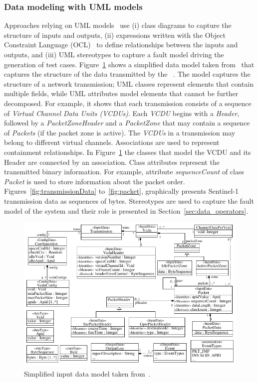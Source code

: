 

\subsubsection{Data modeling with UML models}

Approaches relying on UML models~\cite{di2015generating,di2015evolutionary} use (i) class diagrams to capture the structure of inputs and outputs, (ii) expressions written with the Object Constraint Language (OCL)~\cite{OCL} to define relationships between the inputs and outputs, and (iii) UML stereotypes to capture a fault model driving the generation of test cases.
Figure~\ref{fig:dataModel} shows a simplified data model taken from~\cite{di2015evolutionary} that captures the structure of the data transmitted by the ~\cite{esaSentinel}.
The model captures the structure of a network transmission; UML classes represent elements that contain multiple fields, while UML attributes model elements that cannot be further decomposed. For example, it shows that each transmission consists of a sequence of \emph{Virtual Channel Data Units (VCDUs)}. Each \emph{VCDU} begins with a \emph{Header}, followed by a \emph{PacketZoneHeader} and a \emph{PacketZone} that may contain a sequence of \emph{Packets} (if the packet zone is active).
The \emph{VCDUs} in a transmission may belong to different virtual channels.
Associations are used to represent containment relationships. In Figure~\ref{fig:dataModel} the classes that model the VCDU and its Header are connected by an association.
Class attributes represent the transmitted binary information. For example, attribute \emph{sequenceCount} of class \emph{Packet} is used to store information about the packet order.
Figures~\ref{fig:transmissionData} to~\ref{fig:packet}, graphically presents Sentinel-1 transmission data as sequences of bytes.
Stereotypes are used to capture the fault model of the system and their role is presented in Section~\ref{sec:data_operators}.

\begin{figure}[t!]
  \centering
    \includegraphics{images/classDiagramSmall}
      \caption{Simplified input data model taken from~\cite{di2015evolutionary}.}
      \label{fig:dataModel}
\end{figure}

